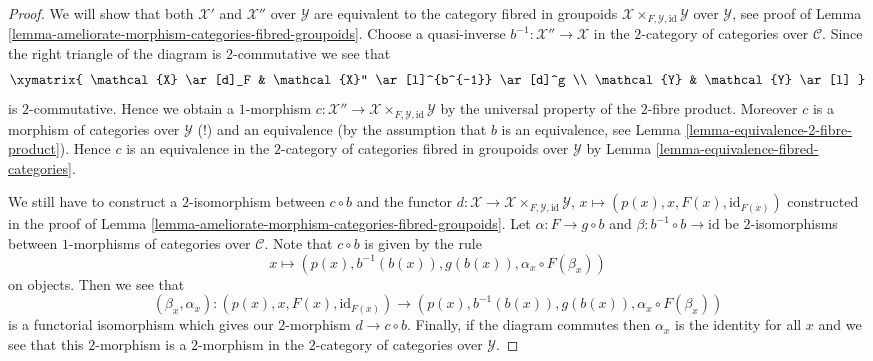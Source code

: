 \begin{proof}
We will show that both $\mathcal{X}'$ and $\mathcal{X}''$ over $\mathcal{Y}$
are equivalent to the category fibred in groupoids
$\mathcal{X} \times_{F, \mathcal{Y}, \text{id}} \mathcal{Y}$
over $\mathcal{Y}$, see proof of
Lemma \ref{lemma-ameliorate-morphism-categories-fibred-groupoids}.
Choose a quasi-inverse $b^{-1} : \mathcal{X}'' \to \mathcal{X}$ in the
$2$-category of categories over $\mathcal{C}$.
Since the right triangle of the diagram is $2$-commutative we see that
$$
\xymatrix{
\mathcal{X} \ar[d]_F & \mathcal{X}'' \ar[l]^{b^{-1}} \ar[d]^g \\
\mathcal{Y} & \mathcal{Y} \ar[l]
}
$$
is $2$-commutative. Hence we obtain a $1$-morphism
$c : \mathcal{X}'' \to
\mathcal{X} \times_{F, \mathcal{Y}, \text{id}} \mathcal{Y}$
by the universal property of the $2$-fibre product. Moreover $c$
is a morphism of categories over $\mathcal{Y}$ (!) and an equivalence
(by the assumption that $b$ is an equivalence, see
Lemma \ref{lemma-equivalence-2-fibre-product}).
Hence $c$ is an equivalence in the $2$-category of categories fibred
in groupoids over $\mathcal{Y}$ by
Lemma \ref{lemma-equivalence-fibred-categories}.

\medskip\noindent
We still have to construct a $2$-isomorphism between $c \circ b$ and
the functor $d : \mathcal{X} \to
\mathcal{X} \times_{F, \mathcal{Y}, \text{id}} \mathcal{Y}$,
$x \mapsto (p(x), x, F(x), \text{id}_{F(x)})$
constructed in the proof of
Lemma \ref{lemma-ameliorate-morphism-categories-fibred-groupoids}.
Let $\alpha : F \to g \circ b$ and $\beta : b^{-1} \circ b \to \text{id}$
be $2$-isomorphisms between $1$-morphisms of categories over $\mathcal{C}$.
Note that $c \circ b$ is given by the rule
$$
x \mapsto (p(x), b^{-1}(b(x)), g(b(x)), \alpha_x \circ F(\beta_x))
$$
on objects. Then we see that
$$
(\beta_x, \alpha_x) :
(p(x), x, F(x), \text{id}_{F(x)})
\longrightarrow
(p(x), b^{-1}(b(x)), g(b(x)), \alpha_x \circ F(\beta_x))
$$
is a functorial isomorphism which gives our $2$-morphism
$d \to c \circ b$. Finally, if the diagram commutes then
$\alpha_x$ is the identity for all $x$ and we see that this
$2$-morphism is a $2$-morphism in the $2$-category of categories
over $\mathcal{Y}$.
\end{proof}

































